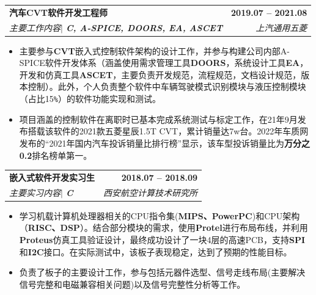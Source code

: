\documentclass[letterpaper,11pt]{article}
\makeatletter
\newcommand{\resumeItem}[1]{	
	\item\small{
		{#1 \vspace{-2pt}}
	}
}
\newcommand{\resumeSubheading}[4]{
	\vspace{-2pt}\item
	\begin{tabular*}{1.0\textwidth}[t]{l@{\extracolsep{\fill}}r}
		\textbf{\CJKfamily{STSong}#1} & \textbf{\small #2} \\
		\textit{\small\CJKfamily{KaiTi}#3} & \textit{\small #4} \\
	\end{tabular*}\vspace{-7pt}
	
}
\newcommand{\resumeItemListStart}{\begin{itemize}}
\newcommand{\resumeItemListEnd}{\end{itemize}\vspace{-5pt}}
\makeatother
\begin{document}
		\resumeSubheading
		{汽车CVT软件开发工程师}{2019.07 -- 2021.08}
		{主要工作内容$|$ \emph{\textbf{C, A-SPICE, DOORS, EA, ASCET}}}{上汽通用五菱}
		
		\resumeItemListStart
		\resumeItem{主要参与\textbf{CVT}嵌入式控制软件架构的设计工作，并参与构建公司内部A-SPICE软件开发体系（涵盖使用需求管理工具\textbf{DOORS}，系统设计工具\textbf{EA}，开发和仿真工具\textbf{ASCET}，主要负责开发规范，流程规范，文档设计规范，版本控制）。此外，个人负责整个软件中车辆驾驶模式识别模块与液压控制模块（占比15\texttt{\%}）的软件功能实现和测试。}
		\resumeItem{项目涵盖的控制软件在离职时已基本完成系统测试与标定工作，在21年9月发布搭载该软件的2021款五菱星辰1.5T CVT，累计销量达7w台。2022年车质网发布的“2021年国内汽车投诉销量比排行榜”显示，该车型投诉销量比为\textbf{万分之0.2}排名榜单第一。}
		\resumeItemListEnd
	
	
		\resumeSubheading	
		{嵌入式软件开发实习生}{2018.07 -- 2018.09}
		{主要实习内容$|$ \emph{\textbf{C}}}{西安航空计算技术研究所}
		
		\resumeItemListStart
		\resumeItem{学习机载计算机处理器相关的CPU指令集(\textbf{MIPS、PowerPC})和CPU架构（\textbf{RISC、DSP}）。结合部分模块的需求，使用\textbf{Protel}进行布局布线，并利用\textbf{Proteus}仿真工具验证设计，最终成功设计了一块4层的高速PCB，支持\textbf{SPI}和\textbf{I2C}接口。在实际测试中，该板子表现稳定，达到了预期的性能目标。}
		\resumeItem{负责了板子的主要设计工作，参与包括元器件选型、信号走线布局(主要解决信号完整和电磁兼容相关问题)以及信号完整性分析等工作。}
		\resumeItemListEnd
		
		
		
		
		
		
		
		
\end{document}
